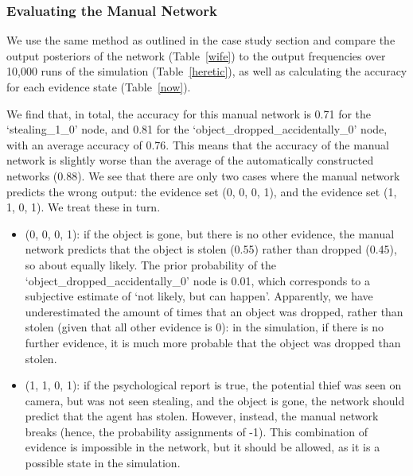 \documentclass[12pt]{article}
\begin{document}
\subsubsection{Evaluating the Manual Network}
 
We use the same method as outlined in the case study section and compare the output posteriors of the network (Table~\ref{wife}) to the output frequencies over 10,000 runs of the simulation (Table~\ref{heretic}), as well as calculating the accuracy for each evidence state (Table~\ref{now}).

We find that, in total, the accuracy for this manual network is 0.71 for the `stealing\_1\_0' node, and 0.81 for the `object\_dropped\_accidentally\_0' node, with an average accuracy of 0.76. This means that the accuracy of the manual network is slightly worse than the average of the automatically constructed networks (0.88). We see that there are only two cases where the manual network predicts the wrong output: the evidence set (0, 0, 0, 1), and the evidence set (1, 1, 0, 1). We treat these in turn.

\begin{itemize}
\item (0, 0, 0, 1): if the object is gone, but there is no other evidence, the manual network predicts that the object is stolen (0.55) rather than dropped (0.45), so about equally likely. The prior probability of the `object\_dropped\_accidentally\_0' node is 0.01, which corresponds to a subjective estimate of `not likely, but can happen'. Apparently, we have underestimated the amount of times that an object was dropped, rather than stolen (given that all other evidence is 0): in the simulation, if there is no further evidence, it is much more probable that the object was dropped than stolen.
\item (1, 1, 0, 1): if the psychological report is true, the potential thief was seen on camera, but was not seen stealing, and the object is gone, the network should predict that the agent has stolen. However, instead, the manual network breaks (hence, the probability assignments of -1). This combination of evidence is impossible in the network, but it should be allowed, as it is a possible state in the simulation.
\end{itemize}
\end{document}
